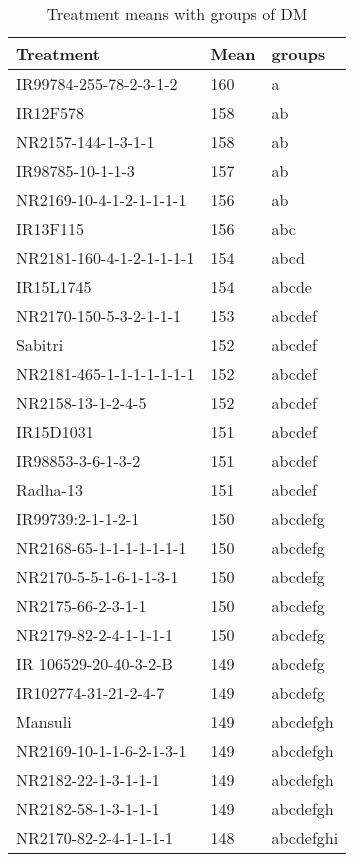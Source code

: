 \documentclass[]{article}
\begin{document}
\begin{longtable}{lll}
\caption{\label{tab:two-fac-groups-tab1}Treatment means with groups of DM}\\
\toprule
Treatment & Mean & groups\\
\midrule
\rowcolor{gray!6}  IR99784-255-78-2-3-1-2 & 160 & a\\
IR12F578 & 158 & ab\\
\rowcolor{gray!6}  NR2157-144-1-3-1-1 & 158 & ab\\
IR98785-10-1-1-3 & 157 & ab\\
\rowcolor{gray!6}  NR2169-10-4-1-2-1-1-1-1 & 156 & ab\\
\addlinespace
IR13F115 & 156 & abc\\
\rowcolor{gray!6}  NR2181-160-4-1-2-1-1-1-1 & 154 & abcd\\
IR15L1745 & 154 & abcde\\
\rowcolor{gray!6}  NR2170-150-5-3-2-1-1-1 & 153 & abcdef\\
Sabitri & 152 & abcdef\\
\addlinespace
\rowcolor{gray!6}  NR2181-465-1-1-1-1-1-1-1 & 152 & abcdef\\
NR2158-13-1-2-4-5 & 152 & abcdef\\
\rowcolor{gray!6}  IR15D1031 & 151 & abcdef\\
IR98853-3-6-1-3-2 & 151 & abcdef\\
\rowcolor{gray!6}  Radha-13 & 151 & abcdef\\
\addlinespace
IR99739:2-1-1-2-1 & 150 & abcdefg\\
\rowcolor{gray!6}  NR2168-65-1-1-1-1-1-1-1 & 150 & abcdefg\\
NR2170-5-5-1-6-1-1-3-1 & 150 & abcdefg\\
\rowcolor{gray!6}  NR2175-66-2-3-1-1 & 150 & abcdefg\\
NR2179-82-2-4-1-1-1-1 & 150 & abcdefg\\
\addlinespace
\rowcolor{gray!6}  IR 106529-20-40-3-2-B & 149 & abcdefg\\
IR102774-31-21-2-4-7 & 149 & abcdefg\\
\rowcolor{gray!6}  Mansuli & 149 & abcdefgh\\
NR2169-10-1-1-6-2-1-3-1 & 149 & abcdefgh\\
\rowcolor{gray!6}  NR2182-22-1-3-1-1-1 & 149 & abcdefgh\\
\addlinespace
NR2182-58-1-3-1-1-1 & 149 & abcdefgh\\
\rowcolor{gray!6}  NR2170-82-2-4-1-1-1-1 & 148 & abcdefghi\\

\end{longtable}
\end{document}
